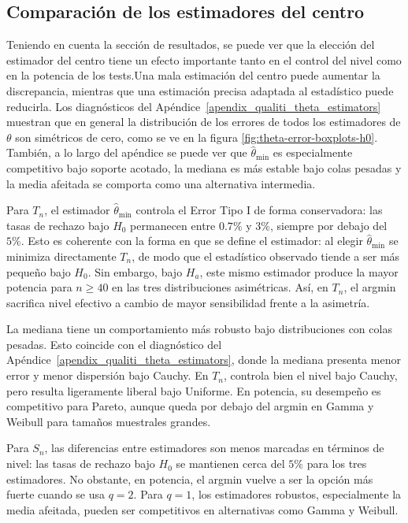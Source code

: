 
\subsection{Comparación de los estimadores del centro}

Teniendo en cuenta la sección de resultados, se puede ver que la elección del estimador del centro tiene un efecto importante tanto en el control del nivel como en la potencia de los tests.Una mala estimación del centro puede aumentar la discrepancia, mientras que una estimación precisa adaptada al estadístico puede reducirla. Los diagnósticos del Apéndice~\ref{apendix_qualiti_theta_estimators} muestran que en general la distribución de los errores de todos los estimadores de $\theta$ son simétricos de cero, como se ve en la figura \ref{fig:theta-error-boxplots-h0}. También, a lo largo del apéndice se puede ver que \(\hat\theta_{\min}\) es especialmente competitivo bajo soporte acotado, la mediana es más estable bajo colas pesadas y la media afeitada se comporta como una alternativa intermedia.

Para \(T_n\), el estimador \(\hat\theta_{\min}\) controla el Error Tipo I de forma conservadora: las tasas de rechazo bajo \(H_0\) permanecen entre \(0.7\%\) y \(3\%\), siempre por debajo del \(5\%\). Esto es coherente con la forma en que se define el estimador: al elegir \(\hat\theta_{\min}\) se minimiza directamente \(T_n\), de modo que el estadístico observado tiende a ser más pequeño bajo \(H_0\). Sin embargo, bajo \(H_a\), este mismo estimador produce la mayor potencia para \(n\ge 40\) en las tres distribuciones asimétricas. Así, en \(T_n\), el argmin sacrifica nivel efectivo a cambio de mayor sensibilidad frente a la asimetría.

La mediana tiene un comportamiento más robusto bajo distribuciones con colas pesadas. Esto coincide con el diagnóstico del Apéndice~\ref{apendix_qualiti_theta_estimators}, donde la mediana presenta menor error y menor dispersión bajo Cauchy. En \(T_n\), controla bien el nivel bajo Cauchy, pero resulta ligeramente liberal bajo Uniforme. En potencia, su desempeño es competitivo para Pareto, aunque queda por debajo del argmin en Gamma y Weibull para tamaños muestrales grandes.

Para \(S_n\), las diferencias entre estimadores son menos marcadas en términos de nivel: las tasas de rechazo bajo \(H_0\) se mantienen cerca del \(5\%\) para los tres estimadores. No obstante, en potencia, el argmin vuelve a ser la opción más fuerte cuando se usa \(q=2\). Para \(q=1\), los estimadores robustos, especialmente la media afeitada, pueden ser competitivos en alternativas como Gamma y Weibull.

